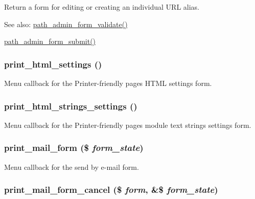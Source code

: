 Return a form for editing or creating an individual URL alias.

\begin{Desc}
\item[See also:]\hyperlink{path_8admin_8inc_4251683f0b26edf9f54db68f4aa5e0b3}{path\_\-admin\_\-form\_\-validate()} 

\hyperlink{path_8admin_8inc_9e4a6b6f202fad04dcdb2bbcd800d168}{path\_\-admin\_\-form\_\-submit()} \end{Desc}
\hypertarget{group__forms_g8cfc5989dfb4cdc66967e6cc9c4dab0f}{
\subsubsection[{print\_\-html\_\-settings}]{\setlength{\rightskip}{0pt plus 5cm}print\_\-html\_\-settings ()}}
\label{group__forms_g8cfc5989dfb4cdc66967e6cc9c4dab0f}


Menu callback for the Printer-friendly pages HTML settings form. \hypertarget{group__forms_g082a0d12b2a36c3aa0d771b982ef414f}{
\subsubsection[{print\_\-html\_\-strings\_\-settings}]{\setlength{\rightskip}{0pt plus 5cm}print\_\-html\_\-strings\_\-settings ()}}
\label{group__forms_g082a0d12b2a36c3aa0d771b982ef414f}


Menu callback for the Printer-friendly pages module text strings settings form. \hypertarget{group__forms_g4ed8b70bdf0ff196b847618f76378c06}{
\subsubsection[{print\_\-mail\_\-form}]{\setlength{\rightskip}{0pt plus 5cm}print\_\-mail\_\-form (\$ {\em form\_\-state})}}
\label{group__forms_g4ed8b70bdf0ff196b847618f76378c06}


Menu callback for the send by e-mail form. \hypertarget{group__forms_gf9d1d6734a5f84ab0272b1ff7d9f0344}{
\subsubsection[{print\_\-mail\_\-form\_\-cancel}]{\setlength{\rightskip}{0pt plus 5cm}print\_\-mail\_\-form\_\-cancel (\$ {\em form}, \/  \&\$ {\em form\_\-state})}}
\label{group__forms_gf9d1d6734a5f84ab0272b1ff7d9f0344}


